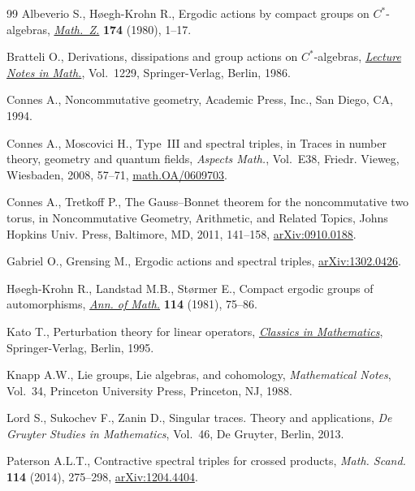 \documentclass[11pt]{article}
\numberwithin{equation}{section}
\begin{document}
\begin{thebibliography}{99}
Albeverio S., H{\o}egh-Krohn R., Ergodic actions by compact groups on
 {$C^{\ast} $}-algebras, \href{http://dx.doi.org/10.1007/BF01215076}{\textit{Math.~Z.}} \textbf{174} (1980), 1--17.

Bratteli O., Derivations, dissipations and group actions on {$C^*$}-algebras,
 \href{http://dx.doi.org/10.1007/BFb0098817}{\textit{Lecture Notes in Math.}}, Vol.~1229, Springer-Verlag, Berlin, 1986.

Connes A., Noncommutative geometry, Academic Press, Inc., San Diego, CA, 1994.

Connes A., Moscovici H., Type~{III} and spectral triples, in Traces in number
 theory, geometry and quantum f\/ields, \textit{Aspects Math.}, Vol.~E38,
 Friedr. Vieweg, Wiesbaden, 2008, 57--71, \href{http://arxiv.org/abs/math.OA/0609703}{math.OA/0609703}.

Connes A., Tretkof\/f P., The {G}auss--{B}onnet theorem for the noncommutative
 two torus, in Noncommutative Geometry, Arithmetic, and Related Topics, Johns
 Hopkins Univ. Press, Baltimore, MD, 2011, 141--158, \href{http://arxiv.org/abs/0910.0188}{arXiv:0910.0188}.

Gabriel O., Grensing M., Ergodic actions and spectral triples,
 \href{http://arxiv.org/abs/1302.0426}{arXiv:1302.0426}.

H{\o}egh-Krohn R., Landstad M.B., St{\o}rmer E., Compact ergodic groups of
 automorphisms, \href{http://dx.doi.org/10.2307/1971377}{\textit{Ann. of Math.}} \textbf{114} (1981), 75--86.

Kato T., Perturbation theory for linear operators, \href{http://dx.doi.org/10.1007/978-3-642-66282-9}{\textit{Classics in Mathematics}},
 Springer-Verlag, Berlin, 1995.

Knapp A.W., Lie groups, {L}ie algebras, and cohomology, \textit{Mathematical
 Notes}, Vol.~34, Princeton University Press, Princeton, NJ, 1988.

Lord S., Sukochev F., Zanin D., Singular traces. Theory and applications,
 \textit{De Gruyter Studies in Mathematics}, Vol.~46, De Gruyter, Berlin,
 2013.

Paterson A.L.T., Contractive spectral triples for crossed products,
 \textit{Math. Scand.} \textbf{114} (2014), 275--298, \href{http://arxiv.org/abs/1204.4404}{arXiv:1204.4404}.


\end{thebibliography}
\end{document}
